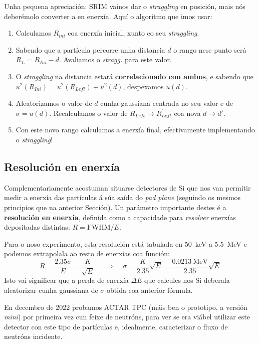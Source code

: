 \documentclass[11pt, a4paper]{article}
\begin{document}
Unha pequena apreciación: SRIM vainos dar o \textit{straggling} en posición, mais nós deberémolo converter a en enerxía. Aquí o algoritmo que imos usar:
\begin{enumerate}
    \item Calculamos $R_{ini}$ coa enerxía inicial, xunto co seu \textit{straggling}.
    \item Sabendo que a partícula percorre unha distancia $d$ o rango nese punto será $R_{L} = R_{Ini} - d$. Avaliamos o \textit{stragg.} para este valor.
    \item O \textit{straggling} na distancia estará \textbf{correlacionado con ambos}, e sabendo que $u^2(R_{Ini}) = u^2(R_{Left}) + u^2(d)$, despexamos $u(d)$.
    \item Aleatorizamos o valor de $d$ cunha gaussiana centrada no seu valor e de $\sigma = u(d)$. Recalculamos o valor de $R_{Left} \longrightarrow R_{Left}^{\prime}$ coa nova $d \longrightarrow d\prime$.
    \item Con este novo rango calculamos a enerxía final, efectivamente implementando o \textit{straggling}!
\end{enumerate}

\subsection{Resolución en enerxía}
Complementariamente acostuman situarse detectores de Si que nos van permitir medir a enerxía das partículas á súa saída do \textit{pad plane} (seguindo os mesmos principios que na anterior Sección). Un parámetro importante destes é a \textbf{resolución en enerxía}, definida como a capacidade para \textit{resolver} enerxías depositadas distintas: $R = \textrm{FWHM} / E$. 

Para o noso experimento, esta resolución está tabulada en \qty{50}{\keV} a \qty{5.5}{\MeV} e podemos extrapolala ao resto de enerxías coa función:
\begin{equation*}
    R = \frac{2.35 \sigma}{E} = \frac{K}{\sqrt{E}} \quad \implies \quad \sigma = \frac{K}{2.35}\sqrt{E} = \frac{\qty{0.0213}{\MeV}}{2.35} \sqrt{E}
\end{equation*}
Isto vai significar que a perda de enerxía $\Delta E$ que calcules nos Si deberala aleatorizar cunha gaussiana de $\sigma$ obtida coa anterior fórmula.


En decembro de 2022 probamos ACTAR TPC (máis ben o prototipo, a versión \textit{mini}) por primeira vez cun feixe de neutróns, para ver se era viábel utilizar este detector con este tipo de partículas e, idealmente, caracterizar o fluxo de neutróns incidente.
\end{document}
